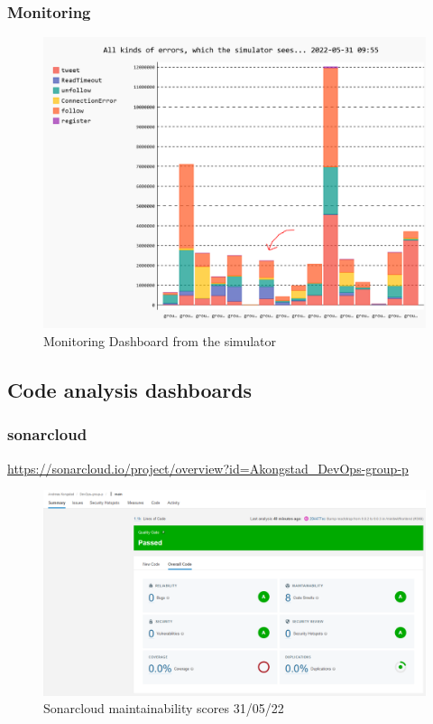 \subsubsection{Monitoring}
\label{app:monitoring}
\begin {figure}[H]
    \centering
    \includegraphics[scale=0.42]{images/SimulatorMonitor.PNG}
    \caption{Monitoring Dashboard from the simulator}
    \label{fig:simMonitor}
\end{figure}

\subsection{Code analysis dashboards}
\label{app:codeAnal}

\subsubsection{sonarcloud}
\label{app:codeAnalSonar}
\href{https://sonarcloud.io/project/overview?id=Akongstad_DevOps-group-p}{https://sonarcloud.io/project/overview?id=Akongstad\_DevOps-group-p}

\begin {figure}[H]
    \centering
    \includegraphics[scale=0.42]{images/analysis_tools/Sonar cloud backend.PNG}
    \caption{Sonarcloud maintainability scores 31/05/22}
    \label{fig:cloudMaintainability}
\end{figure}

